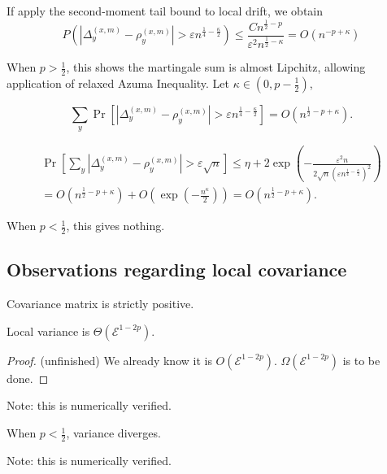 If apply the second-moment tail bound to local drift, we obtain
\[
	P\left( \left| \Delta_y^{(x,m)} - \rho_y^{(x,m)} \right| > \varepsilon n^{\frac{1}{4} - \frac{\kappa}{2}}  \right)
	\le  \frac{C n^{\frac{1}{2} - p}}{\varepsilon^2 n^{\frac{1}{2} - \kappa}} = O(n^{-p + \kappa})
\]

When $p > \frac{1}{2}$, this shows the martingale sum is almost Lipchitz, allowing application of relaxed Azuma Inequality. Let $\kappa \in (0,p - \frac{1}{2})$,

\[
	\sum_y \operatorname{Pr} \left[ \left| \Delta_y^{(x,m)} - \rho_y^{(x,m)} \right| >  \varepsilon n^{\frac{1}{4} - \frac{\kappa}{2}} \right]
	= O\left( n^{\frac{1}{2} - p + \kappa} \right) 
.\] 

\begin{multline}
	\operatorname{Pr} \left[ \sum_y  \left| \Delta_y^{(x,m)} - \rho_y^{(x,m)} \right| >  \varepsilon \sqrt{n}  \right]
	\le \eta + 
	2 \exp\left( - \frac{\varepsilon^2 n}{ 2 \sqrt{n} (\varepsilon n^{\frac{1}{4} - \frac{\kappa}{2}})^2 } \right) \\
	= O\left( n^{\frac{1}{2} - p + \kappa} \right) + O\left( \exp\left( - \frac{n^\kappa}{2} \right)  \right)   
	= O\left( n^{\frac{1}{2} - p + \kappa} \right)
	\label{eqn:azuma-bound-1}
.\end{multline} 



When $p < \frac{1}{2}$, this gives nothing.


\subsection{Observations regarding local covariance}

\begin{lemma}
	Covariance matrix is strictly positive.
\end{lemma}
\begin{lemma}
	Local variance is $\Theta(\mathcal{E}^{1 - 2p})$.
	\label{lemma:local-variance-exact}
\end{lemma}
\begin{proof}
	(unfinished)
	We already know it is $O(\mathcal{E}^{1 - 2p})$. $\Omega(\mathcal{E}^{1 - 2p})$ is to be done.
\end{proof}

Note: this is numerically verified.

\begin{corollary}
	When $p < \frac{1}{2}$, variance diverges.
\end{corollary}
Note: this is numerically verified.

